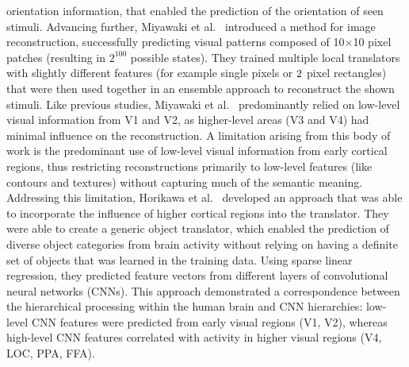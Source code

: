 orientation information, that enabled the prediction of the orientation of seen stimuli. Advancing further, Miyawaki et al.~\cite{miyawakiVisualImageReconstruction2008} introduced a method for image reconstruction, successfully predicting visual patterns composed of 10$\times$10 pixel patches (resulting in $2^{100}$ possible states). They trained multiple local translators with slightly different features (for example single pixels or $2\time1$ pixel rectangles) that were then used together in an ensemble approach to reconstruct the shown stimuli. Like previous studies, Miyawaki et al.~ predominantly relied on low-level visual information from V1 and V2, as higher-level areas (V3 and V4) had minimal influence on the reconstruction. 
A limitation arising from this body of work is the predominant use of low-level visual information from early cortical regions, thus restricting reconstructions primarily to low-level features (like contours and textures) without capturing much of the semantic meaning. Addressing this limitation, Horikawa et al.~\cite{horikawaGenericDecodingSeen2017} developed an approach that was able to incorporate the influence of higher cortical regions into the translator. They were able to create a generic object translator, which enabled the prediction of diverse object categories from brain activity without relying on having a definite set of objects that was learned in the training data. Using sparse linear regression, they predicted feature vectors from different layers of convolutional neural networks (CNNs). This approach demonstrated a correspondence between the hierarchical processing within the human brain and CNN hierarchies: low-level CNN features were predicted from early visual regions (V1, V2), whereas high-level CNN features correlated with activity in higher visual regions (V4, LOC, PPA, FFA).

